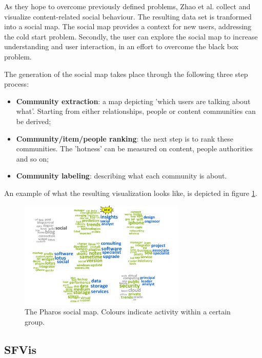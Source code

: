 As they hope to overcome previously defined problems, Zhao et al. \cite{zhao:2010} collect and visualize content-related social behaviour. The resulting data set is tranformed into a social map. The social map provides a context for new users, addressing the cold start problem. Secondly, the user can explore the social map to increase understanding and user interaction, in an effort to overcome the black box problem.

The generation of the social map takes place through the following three step process:

\begin{itemize}
	\item \textbf{Community extraction}: a map depicting 'which users are talking about what'. Starting from either relationships, people or content communities can be derived;
	\item \textbf{Community/item/people ranking}: the next step is to rank these communities. The 'hotness' can be measured on content, people authorities and so on;
	\item \textbf{Community labeling}: describing what each community is about.
\end{itemize}

An example of what the resulting visualization looks like, is depicted in figure \ref{figure:pharos}.

\begin{figure}%
	\begin{center}
		\includegraphics[width=300px]{img/pharos}%
	\end{center}
	\caption{The Pharos social map. Colours indicate activity within a certain group.}%
	\label{figure:pharos}%
\end{figure}




\subsection{SFVis}\label{chapter:survey:section:applications:subsection:sfvis}


